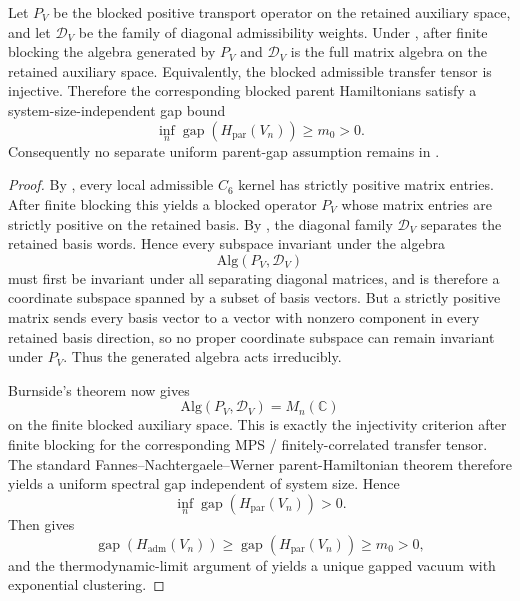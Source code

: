 \begin{theorem}
\label{thm:uniform-parent-gap-injective}
Let $P_V$ be the blocked positive transport operator on the retained auxiliary space, and let
$\mathcal D_V$ be the family of diagonal admissibility weights. Under
, after finite blocking the
algebra generated by $P_V$ and $\mathcal D_V$ is the full matrix algebra on the retained auxiliary
space. Equivalently, the blocked admissible transfer tensor is injective. Therefore the
corresponding blocked parent Hamiltonians satisfy a system-size-independent gap bound
\[
\inf_n \operatorname{gap}(H_{\mathrm{par}}(V_n))\ge m_0>0.
\]
Consequently no separate uniform parent-gap assumption remains in
.
\end{theorem}

\begin{proof}
By , every local admissible $C_6$ kernel has strictly positive
matrix entries. After finite blocking this yields a blocked operator $P_V$ whose matrix entries are
strictly positive on the retained basis. By
, the diagonal family $\mathcal D_V$ separates the
retained basis words. Hence every subspace invariant under the algebra
\[
\mathrm{Alg}(P_V,\mathcal D_V)
\]
must first be invariant under all separating diagonal matrices, and is therefore a coordinate
subspace spanned by a subset of basis vectors. But a strictly positive matrix sends every basis
vector to a vector with nonzero component in every retained basis direction, so no proper
coordinate subspace can remain invariant under $P_V$. Thus the generated algebra acts irreducibly.

Burnside's theorem now gives
\[
\mathrm{Alg}(P_V,\mathcal D_V)=M_n(\mathbb C)
\]
on the finite blocked auxiliary space. This is exactly the injectivity criterion after finite
blocking for the corresponding MPS / finitely-correlated transfer tensor. The standard
Fannes--Nachtergaele--Werner parent-Hamiltonian theorem therefore yields a uniform spectral gap
independent of system size. Hence
\[
\inf_n \operatorname{gap}(H_{\mathrm{par}}(V_n))>0.
\]
Then  gives
\[
\operatorname{gap}(H_{\mathrm{adm}}(V_n))
\ge
\operatorname{gap}(H_{\mathrm{par}}(V_n))
\ge
m_0>0,
\]
and the thermodynamic-limit argument of  yields a unique gapped vacuum
with exponential clustering.
\end{proof}

